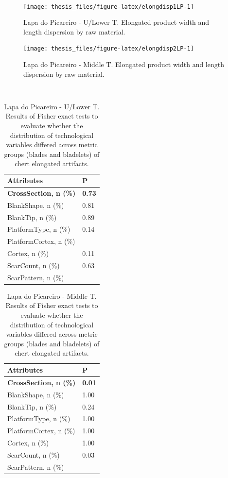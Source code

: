 \documentclass[12pt,twoside]{reedthesis}
\begin{document}
~
\begin{figure}

{\centering \texttt{[image: thesis\_files/figure-latex/elongdisp1LP-1]} 

}

\caption{Lapa do Picareiro - U/Lower T. Elongated product width and length dispersion by raw material.}\label{fig:elongdisp1LP}
\end{figure}
\begin{figure}[H]

{\centering \texttt{[image: thesis\_files/figure-latex/elongdisp2LP-1]} 

}

\caption{Lapa do Picareiro - Middle T. Elongated product width and length dispersion by raw material.}\label{fig:elongdisp2LP}
\end{figure}
~

\begingroup\fontsize{9}{11}\selectfont
\begin{longtable}[t]{ll}
\caption{\label{tab:fisherelongLP1}Lapa do Picareiro - U/Lower T. Results of Fisher exact tests to evaluate whether the distribution of technological variables differed across metric groups (blades and bladelets) of chert elongated artifacts.}\\
\toprule
Attributes & P\\
\midrule
\textbf{CrossSection, n (\%)} & \textbf{0.73}\\
BlankShape, n (\%) & 0.81\\
BlankTip, n (\%) & 0.89\\
PlatformType, n (\%) & 0.14\\
PlatformCortex, n (\%) & \\
\addlinespace
Cortex, n (\%) & 0.11\\
ScarCount, n (\%) & 0.63\\
ScarPattern, n (\%) & \\
\bottomrule
\end{longtable}
\endgroup{}

\begingroup\fontsize{9}{11}\selectfont
\begin{longtable}[t]{ll}
\caption{\label{tab:fisherelongLP2}Lapa do Picareiro - Middle T. Results of Fisher exact tests to evaluate whether the distribution of technological variables differed across metric groups (blades and bladelets) of chert elongated artifacts.}\\
\toprule
Attributes & P\\
\midrule
\textbf{CrossSection, n (\%)} & \textbf{0.01}\\
BlankShape, n (\%) & 1.00\\
BlankTip, n (\%) & 0.24\\
PlatformType, n (\%) & 1.00\\
PlatformCortex, n (\%) & 1.00\\
\addlinespace
Cortex, n (\%) & 1.00\\
ScarCount, n (\%) & 0.03\\
ScarPattern, n (\%) & \\
\bottomrule
\end{longtable}
\endgroup{}
\end{document}
